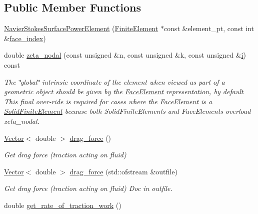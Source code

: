\subsection*{Public Member Functions}
\begin{DoxyCompactItemize}
\item 
\hyperlink{classoomph_1_1NavierStokesSurfacePowerElement_a4755269a509f63be1917ad5dd4061939}{Navier\+Stokes\+Surface\+Power\+Element} (\hyperlink{classoomph_1_1FiniteElement}{Finite\+Element} $\ast$const \&element\+\_\+pt, const int \&\hyperlink{classoomph_1_1FaceElement_a478d577ac6db67ecc80f1f02ae3ab170}{face\+\_\+index})
\item 
double \hyperlink{classoomph_1_1NavierStokesSurfacePowerElement_add4a49170201b878ed97449dd3d55a42}{zeta\+\_\+nodal} (const unsigned \&n, const unsigned \&k, const unsigned \&\hyperlink{cfortran_8h_adb50e893b86b3e55e751a42eab3cba82}{i}) const
\begin{DoxyCompactList}\small\item\em The \char`\"{}global\char`\"{} intrinsic coordinate of the element when viewed as part of a geometric object should be given by the \hyperlink{classoomph_1_1FaceElement}{Face\+Element} representation, by default This final over-\/ride is required for cases where the \hyperlink{classoomph_1_1FaceElement}{Face\+Element} is a \hyperlink{classoomph_1_1SolidFiniteElement}{Solid\+Finite\+Element} because both Solid\+Finite\+Elements and Face\+Elements overload zeta\+\_\+nodal. \end{DoxyCompactList}\item 
\hyperlink{classoomph_1_1Vector}{Vector}$<$ double $>$ \hyperlink{classoomph_1_1NavierStokesSurfacePowerElement_a85b2a9f383e7a52d6789d8ec15be9222}{drag\+\_\+force} ()
\begin{DoxyCompactList}\small\item\em Get drag force (traction acting on fluid) \end{DoxyCompactList}\item 
\hyperlink{classoomph_1_1Vector}{Vector}$<$ double $>$ \hyperlink{classoomph_1_1NavierStokesSurfacePowerElement_a0f98b1da199fd971c7b8b6a9fb74ce60}{drag\+\_\+force} (std\+::ofstream \&outfile)
\begin{DoxyCompactList}\small\item\em Get drag force (traction acting on fluid) Doc in outfile. \end{DoxyCompactList}\item 
double \hyperlink{classoomph_1_1NavierStokesSurfacePowerElement_a65c3fbc22163da89b94374c5b590c5e3}{get\+\_\+rate\+\_\+of\+\_\+traction\+\_\+work} ()

\end{DoxyCompactItemize}
